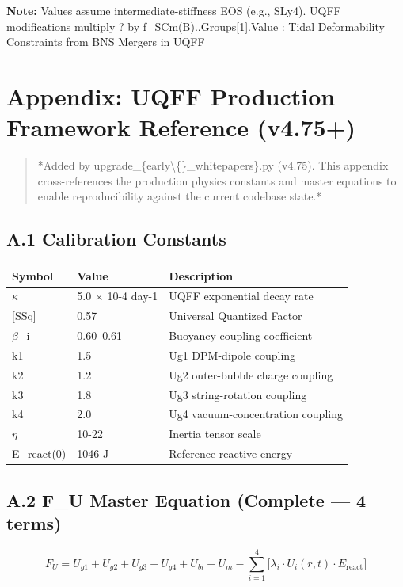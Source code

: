 \documentclass[11pt]{article}
\begin{document}
\textbf{Note:} Values assume intermediate-stiffness EOS (e.g., SLy4). UQFF modifications multiply ? by f\_SCm(B)..Groups[1].Value : Tidal Deformability Constraints from BNS Mergers in UQFF

\section*{Appendix: UQFF Production Framework Reference (v4.75+)}

\begin{quote}
*Added by upgrade\_\{early\textbackslash\{\}\_whitepapers\}.py (v4.75). This appendix cross-references
the production physics constants and master equations to enable reproducibility
against the current codebase state.*
\end{quote}

\subsection*{A.1 Calibration Constants}

\begin{center}
\begin{longtable}{lll}
\toprule
Symbol & Value & Description \tabularnewline
\midrule
\endhead
$\kappa$ & 5.0 $\times$ 10-4 day-1 & UQFF exponential decay rate \tabularnewline
{}[SSq] & 0.57 & Universal Quantized Factor \tabularnewline
$\beta$\_i & 0.60--0.61 & Buoyancy coupling coefficient \tabularnewline
k1 & 1.5 & Ug1 DPM-dipole coupling \tabularnewline
k2 & 1.2 & Ug2 outer-bubble charge coupling \tabularnewline
k3 & 1.8 & Ug3 string-rotation coupling \tabularnewline
k4 & 2.0 & Ug4 vacuum-concentration coupling \tabularnewline
$\eta$ & 10-22 & Inertia tensor scale \tabularnewline
E\_react(0) & 1046 J & Reference reactive energy \tabularnewline
\bottomrule
\end{longtable}
\end{center}

\subsection*{A.2 F\_U Master Equation (Complete --- 4 terms)}

$$F_U = U_{g1} + U_{g2} + U_{g3} + U_{g4} + U_{bi} + U_m - \sum_{i=1}^{4}\bigl[\lambda_i \cdot U_i(r,t) \cdot E_{\mathrm{react}}\bigr]$$
\end{document}
